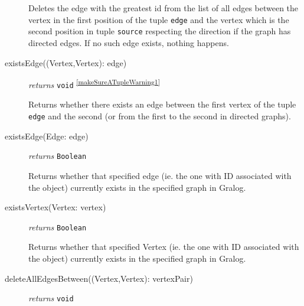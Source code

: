 \documentclass{article}
\begin{document}
\begin{description}
  Deletes the edge with the greatest id from the list of all edges
  between the vertex in the first position of the tuple \texttt{edge} and the vertex which is the second position in tuple \texttt{source} respecting
  the direction if the graph has directed edges. If no such edge exists, nothing happens.




\item[existsEdge((Vertex,Vertex): edge)] \emph{returns}
  \texttt{void} \textsuperscript{\ref{makeSureATupleWarning1}}

  Returns whether there exists an edge between the first vertex of the tuple \texttt{edge} and the second (or from the first to the second in directed graphs).
  
  
\item[existsEdge(Edge: edge)] \emph{returns}
  \texttt{Boolean}

  Returns whether that specified edge (ie. the one with ID associated with the object) currently exists in the specified graph in Gralog. 
  

  
\item[existsVertex(Vertex: vertex)] \emph{returns}
  \texttt{Boolean}

  Returns whether that specified Vertex (ie. the one with ID associated with the object) currently exists in the specified graph in Gralog. 
  



\item[deleteAllEdgesBetween((Vertex,Vertex): vertexPair)] \emph{returns}
  \texttt{void}


\end{description}
\end{document}

